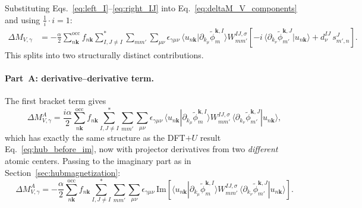 \documentclass[11pt]{article}
\begin{document}
Substituting Eqs.~\eqref{eq:left_I}--\eqref{eq:right_IJ} into
Eq.~\eqref{eq:deltaM_V_components} and using $\tfrac{1}{i}\cdot i = 1$:
\begin{align}
  \Delta M_{V,\gamma}
  &=
  -\frac{\alpha}{2}
  \sum_{n\mathbf{k}}^{\mathrm{occ}}f_{n\mathbf{k}}
  \sum_{I,J\ne I}^{*}\sum_{mm'}\sum_{\mu\nu}
  \epsilon_{\gamma\mu\nu}\,
  \langle u_{n\mathbf{k}}|\partial_{k_\mu}\widetilde\phi^{\mathbf{k},I}_{m}\rangle
  W_{mm'}^{IJ,\sigma}
  \!\left[
    -i\,\langle\partial_{k_\nu}\widetilde\phi^{\mathbf{k},J}_{m'}|u_{n\mathbf{k}}\rangle
    +
    d^{IJ}_\nu\,s^{J}_{m',n}
  \right].
  \label{eq:deltaM_V_split}
\end{align}
This splits into two structurally distinct contributions.

\paragraph{Part~A: derivative--derivative term.}
The first bracket term gives
\begin{equation}
  \Delta M_{V,\gamma}^{A}
  =
  \frac{i\alpha}{2}
  \sum_{n\mathbf{k}}^{\mathrm{occ}}f_{n\mathbf{k}}
  \sum_{I,J\ne I}^{*}\sum_{mm'}\sum_{\mu\nu}
  \epsilon_{\gamma\mu\nu}\,
  \langle u_{n\mathbf{k}}|\partial_{k_\mu}\widetilde\phi^{\mathbf{k},I}_{m}\rangle
  W_{mm'}^{IJ,\sigma}\,
  \langle\partial_{k_\nu}\widetilde\phi^{\mathbf{k},J}_{m'}|u_{n\mathbf{k}}\rangle,
  \label{eq:deltaM_VA}
\end{equation}
which has exactly the same structure as the DFT$+U$ result
Eq.~\eqref{eq:hub_before_im}, now with projector derivatives from two
\emph{different} atomic centers.  Passing to the imaginary part as in
Section~\ref{sec:hubmagnetization}:
\begin{equation}
  \Delta M_{V,\gamma}^{A}
  =
  -\frac{\alpha}{2}
  \sum_{n\mathbf{k}}^{\mathrm{occ}}f_{n\mathbf{k}}
  \sum_{I,J\ne I}^{*}\sum_{mm'}\sum_{\mu\nu}
  \epsilon_{\gamma\mu\nu}\,
  \mathrm{Im}\!\left[
    \langle u_{n\mathbf{k}}|\partial_{k_\mu}\widetilde\phi^{\mathbf{k},I}_{m}\rangle
    W_{mm'}^{IJ,\sigma}\,
    \langle\partial_{k_\nu}\widetilde\phi^{\mathbf{k},J}_{m'}|u_{n\mathbf{k}}\rangle
  \right].
  \label{eq:deltaM_VA_im}
\end{equation}
\end{document}
